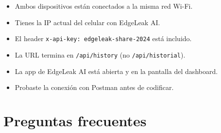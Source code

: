 \documentclass[12pt, a4paper]{article}
\begin{document}
\vspace{0.5cm}

\begin{tcolorbox}[successbox, title={\faCheckCircle\ Lista de verificación antes del primer intento}]
  \begin{itemize}[leftmargin=*, label=\checkmark]
    \item Ambos dispositivos están conectados a la misma red Wi-Fi.
    \item Tienes la IP actual del celular con EdgeLeak AI.
    \item El header \texttt{x-api-key: edgeleak-share-2024} está incluido.
    \item La URL termina en \texttt{/api/history} (no \texttt{/api/historial}).
    \item La app de EdgeLeak AI está abierta y en la pantalla del dashboard.
    \item Probaste la conexión con Postman antes de codificar.
  \end{itemize}
\end{tcolorbox}

\section{Preguntas frecuentes}
\end{document}
